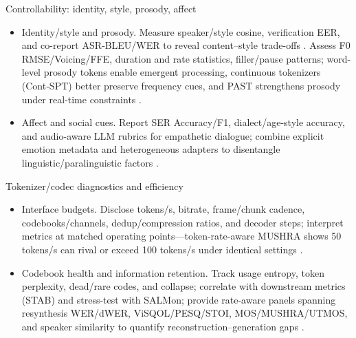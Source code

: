 Controllability: identity, style, prosody, affect
\begin{itemize}
  \item Identity/style and prosody. Measure speaker/style cosine, verification EER, and co-report ASR‑BLEU/WER to reveal content–style trade-offs \cite{wang2024whydospeechlanguagemodelsfailgeneratesem,entry2025towardjointlanguagemodelingspeechunitste,jo2025lmsptalignedsemanticdistillationspeechto,entry2025indicsuperbspeechprocessinguniversalperf}. Assess F0 RMSE/Voicing/FFE, duration and rate statistics, filler/pause patterns; word-level prosody tokens enable emergent processing, continuous tokenizers (Cont‑SPT) better preserve frequency cues, and PAST strengthens prosody under real-time constraints \cite{qian2025prosodylmuncoveringemergingprosodyproces,li2025continuousspeechtokenizertext,har-tuv2025pastphoneticacousticspeechtokenizer,onda2025benchmarkingprosodyencodingdiscretespeec}.
  \item Affect and social cues. Report SER Accuracy/F1, dialect/age-style accuracy, and audio-aware LLM rubrics for empathetic dialogue; combine explicit emotion metadata and heterogeneous adapters to disentangle linguistic/paralinguistic factors \cite{wang2024blspemotowardsempatheticlargespeechlangu,wang2025dualinformationspeechlanguagemodelsemoti,wang2025incorporatingcontextualparalinguisticund}.
\end{itemize}

Tokenizer/codec diagnostics and efficiency
\begin{itemize}
  \item Interface budgets. Disclose tokens/s, bitrate, frame/chunk cadence, codebooks/channels, dedup/compression ratios, and decoder steps; interpret metrics at matched operating points—token-rate-aware MUSHRA shows 50 tokens/s can rival or exceed 100 tokens/s under identical settings \cite{yang2025diffsoundstreamefficientspeechtokenizati}.
  \item Codebook health and information retention. Track usage entropy, token perplexity, dead/rare codes, and collapse; correlate with downstream metrics (STAB) and stress-test with SALMon; provide rate-aware panels spanning resynthesis WER/dWER, ViSQOL/PESQ/STOI, MOS/MUSHRA/UTMOS, and speaker similarity to quantify reconstruction–generation gaps \cite{vashishth2024stabspeechtokenizerassessmentbenchmark,maimon2025salmonsuiteacousticlanguagemodelevaluati,har-tuv2025pastphoneticacousticspeechtokenizer,wu2023speechgenunlockinggenerativepowerspeechl,wang2023slmbridgethingapbetweenspeechtextfoundat}.
\end{itemize}

